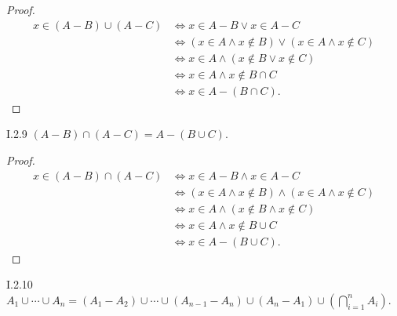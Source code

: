 \begin{proof}
	\begingroup
	\allowdisplaybreaks%
	\begin{align*}
		x \in (A - B) \cup (A - C) & \iff x \in A - B \lor x \in A - C                               \\
		                           & \iff (x \in A \land x \notin B) \lor (x \in A \land x \notin C) \\
		                           & \iff x \in A \land (x \notin B \lor x \notin C)                 \\
		                           & \iff x \in A \land x \notin B \cap C                            \\
		                           & \iff x \in A - (B \cap C).
	\end{align*}
	\endgroup
\end{proof}

\begin{problem}{I.2.9}
\( (A - B) \cap (A - C) = A - (B \cup C) \).
\end{problem}

\begin{proof}
	\begingroup
	\allowdisplaybreaks%
	\begin{align*}
		x \in (A - B) \cap (A - C) & \iff x \in A - B \land x \in A - C                               \\
		                           & \iff (x \in A \land x \notin B) \land (x \in A \land x \notin C) \\
		                           & \iff x \in A \land (x \notin B \land x \notin C)                 \\
		                           & \iff x \in A \land x \notin B \cup C                             \\
		                           & \iff x \in A - (B \cup C).
	\end{align*}
	\endgroup
\end{proof}

\begin{problem}{I.2.10}
\( A_{1} \cup \cdots \cup A_{n} = (A_{1} - A_{2}) \cup \cdots \cup (A_{n-1} - A_{n}) \cup (A_{n} - A_{1}) \cup \left( \bigcap^{n}_{i=1}A_{i} \right) \).
\end{problem}

